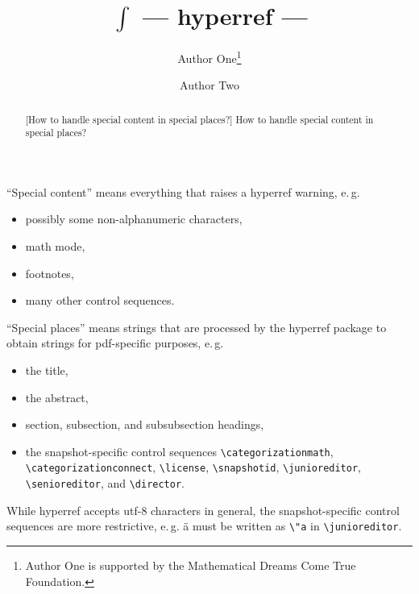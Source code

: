\documentclass{snapshotmfo}
\author{Author One\thanks{Author One is supported by the Mathematical Dreams Come True Foundation.} \and Author Two}
\title{\texorpdfstring{$\int$ }{}--- hyperref ---\texorpdfstring{ \reflectbox{$\int$}}{}}
\begin{document}

\begin{abstract}[How to handle special content in special places?]
How to handle special content in special places?
\end{abstract}

\noindent ``Special content'' means everything that raises a hyperref warning, e.\,g.
\begin{itemize}
  \item possibly some non-alphanumeric characters,
  \item math mode,
  \item footnotes,
  \item many other control sequences.
\end{itemize}

\noindent ``Special places'' means strings that are processed by the hyperref package to obtain strings for pdf-specific purposes, e.\,g.
\begin{itemize}
  \item the title,
  \item the abstract,
  \item section, subsection, and subsubsection headings,
  \item the snapshot-specific control sequences
  \verb+\categorizationmath+,\\
  \verb+\categorizationconnect+,
  \verb+\license+,
  \verb+\snapshotid+,
  \verb+\junioreditor+,\\
  \verb+\senioreditor+, and
  \verb+\director+.
\end{itemize}
While hyperref accepts utf-8 characters in general, the snapshot-specific control sequences are more restrictive, e.\,g. ä must be written as \verb+\"a+ in \verb+\junioreditor+.
\end{document}
